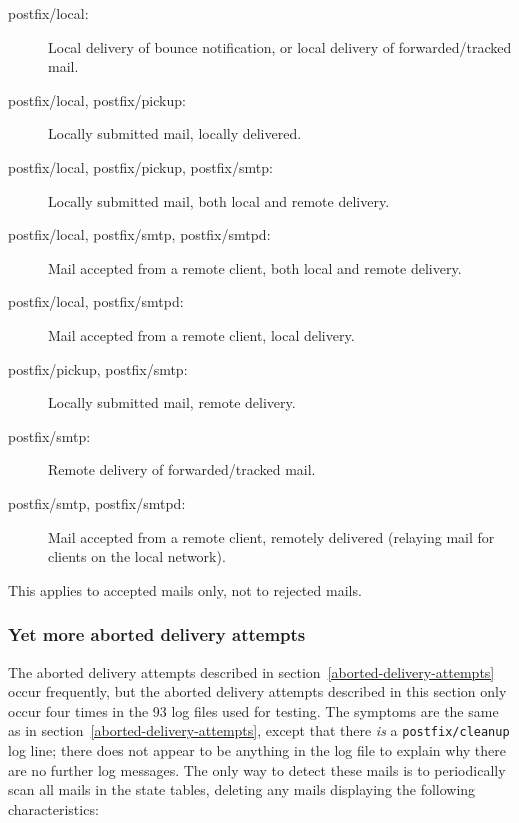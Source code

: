 \documentclass[a4paper,12pt,draft]{article}
\begin{document}
\begin{description}

    \item [postfix/local:] Local delivery of bounce notification, or local
        delivery of forwarded/tracked mail.

    \item [postfix/local, postfix/pickup:] Locally submitted mail, locally
        delivered.

    \item [postfix/local, postfix/pickup, postfix/smtp:] Locally submitted
        mail, \newline both local and remote delivery.

    \item [postfix/local, postfix/smtp, postfix/smtpd:] Mail accepted from
        a remote client, both local and remote delivery.

    \item [postfix/local, postfix/smtpd:] Mail accepted from a remote
        client, local delivery.

    \item [postfix/pickup, postfix/smtp:] Locally submitted mail, remote
        delivery.

    \item [postfix/smtp:] Remote delivery of forwarded/tracked mail.

    \item [postfix/smtp, postfix/smtpd:] Mail accepted from a remote
        client, remotely delivered (relaying mail for clients on the local
        network).

\end{description}

This applies to accepted mails only, not to rejected mails.

\subsubsection{Yet more aborted delivery attempts}

\label{yet-more-aborted-delivery-attempts}

The aborted delivery attempts described in
section~\ref{aborted-delivery-attempts} occur frequently, but the aborted
delivery attempts described in this section only occur four times in the 93
log files used for testing.  The symptoms are the same as in
section~\ref{aborted-delivery-attempts}, except that there \textit{is\/} a
\texttt{postfix/cleanup} log line; there does not appear to be anything in
the log file to explain why there are no further log messages.  The only
way to detect these mails is to periodically scan all mails in the state
tables, deleting any mails displaying the following characteristics:
\end{document}
